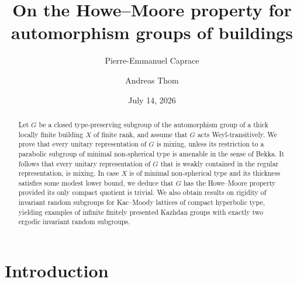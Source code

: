 \documentclass[12pt,a4paper]{amsproc}
\title[The Howe--Moore property]
{On the Howe--Moore property for\\ automorphism groups of buildings}
\author[P.-E. Caprace]{Pierre-Emmanuel Caprace}
\author[A. Thom]{Andreas Thom}
\date{July 14, 2026}
\theoremstyle{definition}
\begin{document}
\begin{abstract}
Let $G$ be a closed type-preserving subgroup of the automorphism group of a thick locally finite building $X$ of finite rank, and assume that $G$ acts Weyl-transitively. We prove that every   unitary representation of $G$ is mixing, unless its restriction to a parabolic subgroup of minimal non-spherical type is amenable in the sense of Bekka. It follows that every unitary representation of $G$ that is weakly contained in the regular representation, is mixing. In case $X$ is of minimal non-spherical type and its thickness satisfies some modest lower bound, we deduce that $G$  has the Howe--Moore property provided its only compact quotient is trivial. We also  obtain results on  rigidity of invariant random subgroups for Kac--Moody lattices of compact hyperbolic type, yielding examples of infinite finitely presented Kazhdan groups with exactly two  ergodic invariant random subgroups.
\end{abstract}

\maketitle


\section{Introduction}
\label{sec:introduction}
\end{document}

